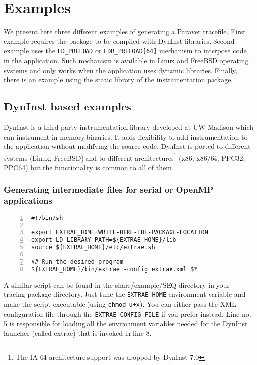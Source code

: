 \chapter{Examples}\label{cha:Examples}

We present here three different examples of generating a Paraver tracefile. First example requires the package to be compiled with DynInst libraries. Second example uses the {\tt LD\_PRELOAD} or {\tt LDR\_PRELOAD[64]} mechanism to interpose code in the application. Such mechanism is available in Linux and FreeBSD operating systems and only works when the application uses dynamic libraries. Finally, there is an example using the static library of the instrumentation package.

\section{DynInst based examples}\label{sec:Examples_DynInst}

DynInst is a third-party instrumentation library developed at UW Madison which can instrument in-memory binaries. It adds flexibility to add instrumentation to the application without modifying the source code. DynInst is ported to different systems (Linux, FreeBSD) and to different architectures\footnote{The IA-64 architecture support was dropped by DynInst 7.0} (x86, x86/64, PPC32, PPC64) but the functionality is common to all of them.

\subsection{Generating intermediate files for serial or OpenMP applications}\label{subsec:Examples_DynInst_Intermediate}

\begin{Verbatim}[frame=single,numbers=left,labelposition=topline,label=run\_dyninst.sh]
#!/bin/sh

export EXTRAE_HOME=WRITE-HERE-THE-PACKAGE-LOCATION
export LD_LIBRARY_PATH=${EXTRAE_HOME}/lib
source ${EXTRAE_HOME}/etc/extrae.sh

## Run the desired program
${EXTRAE_HOME}/bin/extrae -config extrae.xml $*
\end{Verbatim}

A similar script can be found in the share/example/SEQ directory in your tracing package directory. Just tune the {\tt EXTRAE\_HOME} environment variable and make the script executable (using {\tt chmod u+x}). You can either pass the XML configuration file through the {\tt EXTRAE\_CONFIG\_FILE} if you prefer instead. Line no. 5 is responsible for loading all the environment variables needed for the DynInst launcher (called extrae) that is invoked in line 8.

